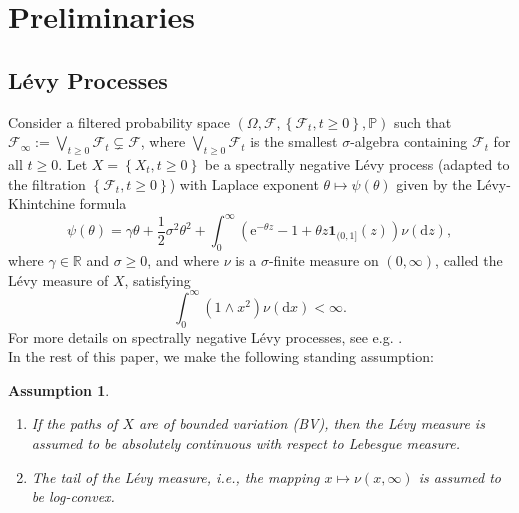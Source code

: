 \documentclass[11pt,reqno]{amsart}
\newcommand{\green}{\textcolor[rgb]{0.00,0.50,0.50}}
\newtheorem{assumption}{Assumption}[section]
\newcommand{\p}{\mathbb{P}}
\newcommand{\reals}{\mathbb{R}}
\newcommand{\ind}{\mathbf{1}}
\renewcommand{\geq}{\geqslant}
\begin{document}


\section{Preliminaries}\label{Sec:Preliminary}
\subsection{L\'evy Processes}
Consider a filtered probability space $\left( \Omega, \mathcal{F}, \left\lbrace \mathcal{F}_t, t \geq 0 \right\rbrace, \p \right)$ such that $\mathcal{F}_\infty := \bigvee_{t \geq 0} \mathcal{F}_t \subsetneq \mathcal{F}$, where $\bigvee_{t \geq 0} \mathcal{F}_t$ is the smallest $\sigma$-algebra containing $\mathcal{F}_t$ for all $t \geq 0$. Let $X=\left\lbrace X_t , t \geq 0 \right\rbrace$ be a spectrally negative Lévy process (adapted to the filtration $\left\lbrace \mathcal{F}_t, t \geq 0 \right\rbrace$) with Laplace exponent $\theta \mapsto \psi (\theta)$ given by the L\'evy-Khintchine formula
\begin{equation}\label{eq.Laplace}
\psi(\theta) = \gamma \theta + \frac{1}{2} \sigma^2 \theta^2 + \int^{\infty}_0 \left( \mathrm{e}^{-\theta z} - 1 + \theta z \ind_{(0,1]}(z) \right) \nu(\mathrm{d}z) ,
\end{equation}
where $\gamma \in \reals$ and $\sigma \geq 0$, and where $\nu$ is a $\sigma$-finite measure on $(0,\infty)$, called the L\'{e}vy measure of $X$, satisfying
\begin{equation*}
\int^{\infty}_0 (1 \wedge x^2) \nu(\mathrm{d}x) < \infty .
\end{equation*}
For more details on spectrally negative Lévy processes, see e.g.
\cite{kyprianou_2014}.\\
In the rest of this paper, we make the following standing assumption:
\begin{assumption}\label{standing-assumption}
	\begin{enumerate}
	\item If the paths of $X$ are of bounded variation (BV), then the Lévy measure is assumed to be absolutely continuous with respect to Lebesgue measure.
	\item The tail of the L\'evy measure, i.e., the mapping $x \mapsto \nu(x,\infty)$ is assumed to be log-convex.
	\end{enumerate}%
\end{assumption}
\end{document}
